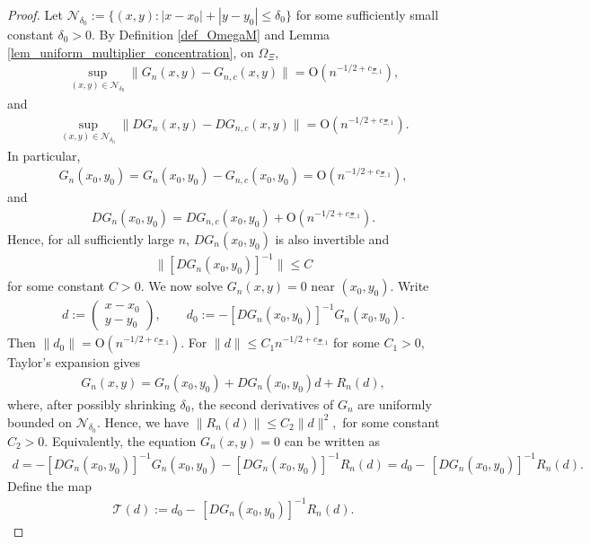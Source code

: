 \documentclass[10pt,a4paper]{amsart}
\begin{document}
\begin{proof}
	Let $\mathcal N_{\delta_0}:=\{(x,y): |x-x_0|+|y-y_0|\le \delta_0\}$ for some sufficiently small constant $\delta_0>0$. By Definition \ref{def_OmegaM} and Lemma \ref{lem_uniform_multiplier_concentration}, on $\Omega_{\Xi}$,
	\begin{align*}
		\sup_{(x,y)\in\mathcal N_{\delta_0}}
		\|G_n(x,y)-G_{n,c}(x,y)\|=\mathrm{O}(n^{-1/2+c_{\Xi,1}}),
	\end{align*} 
	and
	\begin{align*}
		\sup_{(x,y)\in\mathcal N_{\delta_0}}
		\|DG_n(x,y)-DG_{n,c}(x,y)\|=\mathrm{O}(n^{-1/2+c_{\Xi,1}}).
	\end{align*}
	In particular,
	\begin{align*}
		G_n(x_0,y_0)=G_n(x_0,y_0)-G_{n,c}(x_0,y_0)=\mathrm{O}(n^{-1/2+c_{\Xi,1}}),
	\end{align*}
	and
	\begin{align*}
		DG_n(x_0,y_0)= DG_{n,c}(x_0,y_0)+\mathrm{O}(n^{-1/2+c_{\Xi,1}}).
	\end{align*}
	Hence, for all sufficiently large $n$, $DG_n(x_0,y_0)$ is also invertible and
	\begin{align*}
		\|[DG_n(x_0,y_0)]^{-1}\|\le C
	\end{align*}
	for some constant $C>0$. We now solve $G_n(x,y)=0$ near $(x_0,y_0)$. Write
	\begin{align*}
		d:=
		\begin{pmatrix}
			x-x_0\\
			y-y_0
		\end{pmatrix},
		\qquad
		d_0:=
		-[DG_n(x_0,y_0)]^{-1}G_n(x_0,y_0).
	\end{align*}
	Then $\|d_0\|=\mathrm{O}(n^{-1/2+c_{\Xi,1}})$.
	For $\|d\|\le C_1n^{-1/2+c_{\Xi,1}}$ for some $C_1>0$, Taylor's expansion gives
	\begin{align*}
		G_n(x,y)=G_n(x_0,y_0)+DG_n(x_0,y_0)d+R_n(d),
	\end{align*}
	where, after possibly shrinking $\delta_0$, the second derivatives of $G_n$ are uniformly bounded on $\mathcal N_{\delta_0}$. Hence, we have $ \|R_n(d)\|\le C_2\|d\|^2,$ for some constant $C_2>0$. Equivalently, the equation $G_n(x,y)=0$ can be written as
	\begin{align*}
		d=-[DG_n(x_0,y_0)]^{-1}G_n(x_0,y_0)-
		[DG_n(x_0,y_0)]^{-1}R_n(d)
		=
		d_0-\,[DG_n(x_0,y_0)]^{-1}R_n(d).
	\end{align*}
	Define the map
	\begin{align*}
		\mathcal T(d)
		:=
		d_0-\,[DG_n(x_0,y_0)]^{-1}R_n(d).
	\end{align*}

\end{proof}
\end{document}
